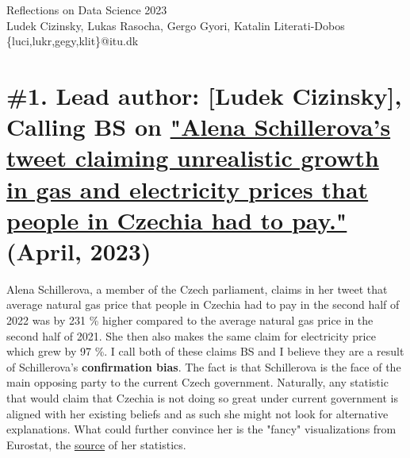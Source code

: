 \documentclass[fleqn,12pt]{article}
\begin{document}
\setlength{\baselineskip}{1.15\baselineskip}


\begin{center}
  {\Huge Reflections on Data Science 2023}\\[2ex]
  {Ludek Cizinsky, Lukas Rasocha, Gergo Gyori, Katalin Literati-Dobos}\\
  [2ex]
  {\{luci,lukr,gegy,klit\}@itu.dk}\\[2ex]
\end{center}

\tableofcontents
\parindent=20pt 
\parskip=0mm
\newpage

\section{\#1. Lead author: [Ludek Cizinsky], Calling BS on \href{https://twitter.com/alenaschillerov/status/1651167356687732736?s=20}{"Alena Schillerova's tweet claiming unrealistic growth 
in gas and electricity prices that people in Czechia had to pay."} (April, 2023)} 
Alena Schillerova, a member of the Czech parliament, claims in her tweet that average natural gas price 
that people in Czechia had to pay in the second half of 2022 was by 231 \% higher compared to the average natural gas price 
in the second half of 2021. She then also makes the same claim for electricity price which grew by 97 \%. I call both of these claims BS and I believe they are 
a result of Schillerova's \textbf{confirmation bias}. The fact is that Schillerova is the face of the main opposing party to the current Czech government. Naturally, 
any statistic that would claim that Czechia is not doing so great under current government is aligned with her existing beliefs and as such she might not look for alternative 
explanations. What could further convince her is the "fancy" visualizations from Eurostat, the \href{https://bit.ly/alenka-eurostat}{source} of her statistics.
\end{document}
